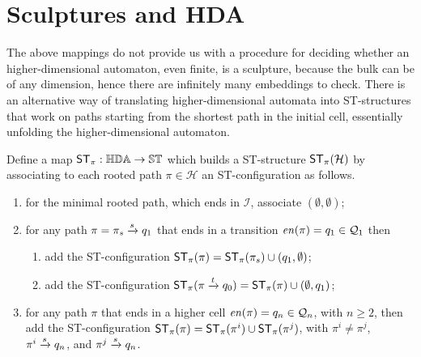\section{Sculptures and HDA}

    The above mappings do not provide us with a procedure for deciding whether an higher-dimensional automaton, even finite, is a sculpture, because the bulk can be of any dimension, hence there are infinitely many embeddings to check. There is an alternative way of translating higher-dimensional automata into ST-structures that work on paths starting from the shortest path in the initial cell, essentially unfolding the higher-dimensional automaton.

    \begin{definition}
        \label{def:HDA-to-ST-paths}
        Define a map $\mathsf{ST}_{\pi}:\mathbb{HDA}\rightarrow\mathbb{ST}$ which builds a ST-structure $\mathsf{ST}_{\pi}(\mathcal{H})$ by associating to each rooted path $\pi\in \mathcal{H}$ an ST-configuration as follows.
        \begin{enumerate}
            \item\label{hintost_1_1} for the minimal rooted path, which ends in $\mathcal{I}$, associate $(\emptyset,\emptyset)$;

            \item\label{hintost_2_2} for any path $\pi=\pi_{s}\xrightarrow{s}q_{1}$ that ends in a transition $\mathit{en}(\pi)=q_{1}\in \mathcal{Q}_{1}$ then 
            \begin{enumerate}
                \item\label{hintost_2_21} add the ST-configuration $\mathsf{ST}_{\pi}(\pi)=\mathsf{ST}_{\pi}(\pi_{s})\cup(q_{1},\emptyset)$;
                \item\label{hintost_2_22} add the ST-configuration $\mathsf{ST}_{\pi}(\pi\xrightarrow{t}q_{0})=\mathsf{ST}_{\pi}(\pi)\cup(\emptyset,q_{1})$;
            \end{enumerate}

            \item\label{hintost_3_3} for any path $\pi$ that ends in a higher cell $\mathit{en}(\pi)=q_{n}\in \mathcal{Q}_{n}$, with $n\geq 2$, then add the ST-configuration $\mathsf{ST}_{\pi}(\pi)=\mathsf{ST}_{\pi}(\pi^{i}) \cup \mathsf{ST}_{\pi}(\pi^{j})$, with $\pi^{i} \neq \pi^{j}$, $\pi^{i}\xrightarrow{s}q_{n}$, and $\pi^{j}\xrightarrow{s}q_{n}$.
        \end{enumerate}
 
    \end{definition}
    
